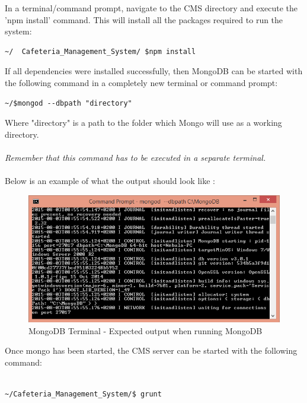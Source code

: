 \documentclass[a4paper,12pt]{report}
\begin{document}
In a terminal/command prompt, navigate to the CMS directory and execute the 'npm install' command. This will install all the packages required to run the system: 


\begin{verbatim}
~/  Cafeteria_Management_System/ $npm install
\end{verbatim}

If all dependencies were installed successfully, then MongoDB can be started with the following command in a completely new terminal or command prompt:
\begin{verbatim}
~/$mongod --dbpath "directory"
\end{verbatim}

Where "directory"  is a path to the folder which Mongo will use as a working directory.\\ \\
{\em Remember that this command has to be executed in a separate terminal.}\\ \\
Below is an example of what the output should look like :

\begin{figure}[H]
  \centering
    \includegraphics[width=1.0\textwidth]{screenshots/MongoDB.png}
    \caption{MongoDB Terminal - Expected output when running MongoDB} 
\end{figure}

Once mongo has been started, the CMS server can be started with the following command:\\ \\

\begin{verbatim}
~/Cafeteria_Management_System/$ grunt
\end{verbatim}
\end{document}

